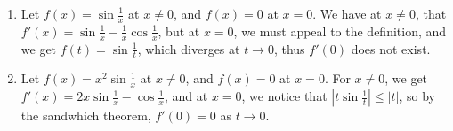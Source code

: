 \begin{example}
    \begin{enumerate}[label=(\arabic*)]
        \item Let $f(x)=\sin{\frac{1}{x}}$ at $x \neq 0$, and  $f(x)=0$ at  $x=0$. We 
            have at $x \neq 0$, that  $f'(x)=\sin{\frac{1}{x}}-\frac{1}{x}\cos{\frac{1}{x}}$, but 
            at $x=0$, we must appeal to the definition, and we get  $f(t)=\sin{\frac{1}{t}}$, which 
            diverges at $t \rightarrow 0$, thus  $f'(0)$ does not exist. 

        \item Let $f(x)=x^2\sin{\frac{1}{x}}$ at $x \neq 0$, and  $f(x)=0$ at  $x=0$. For 
            $x \neq 0$, we get  $f'(x)=2x\sin{\frac{1}{x}}-\cos{\frac{1}{x}}$, and at $x = 0$, 
            we notice that  $|t\sin{\frac{1}{t}}| \leq |t|$, so by the sandwhich theorem, $f'(0)=0$ 
            as  $t \rightarrow 0$.
    \end{enumerate}		
\end{example} 
